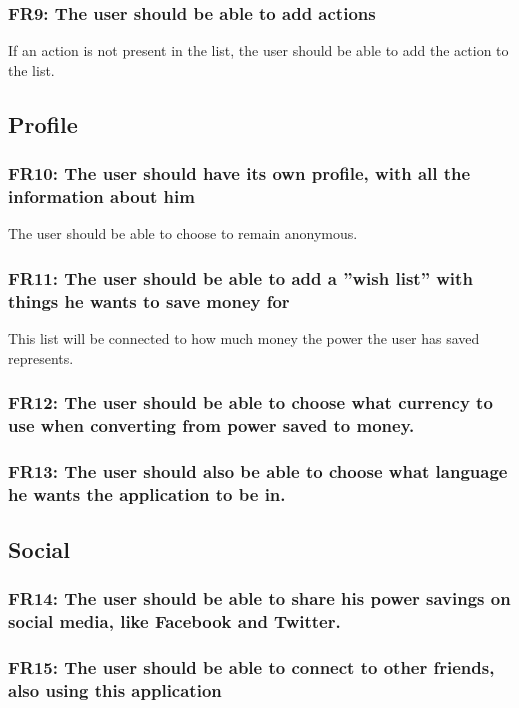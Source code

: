 \subsubsection{FR9: The user should be able to add actions}
If an action is not present in the list, the user should be able to add the action to the list.



\subsection{Profile}

\subsubsection{FR10: The user should have its own profile, with all the information about him}
The user should be able to choose to remain anonymous.

\subsubsection{FR11: The user should be able to add a ''wish list'' with things he wants to save money for}
This list will be connected to how much money the power the user has saved represents.

\subsubsection{FR12: The user should be able to choose what currency to use when converting from power saved to money.}

\subsubsection{FR13: The user should also be able to choose what language he wants the application to be in.}


\subsection{Social}
\subsubsection{FR14: The user should be able to share his power savings on social media, like Facebook and Twitter.}

\subsubsection{FR15: The user should be able to connect to other friends, also using this application}

